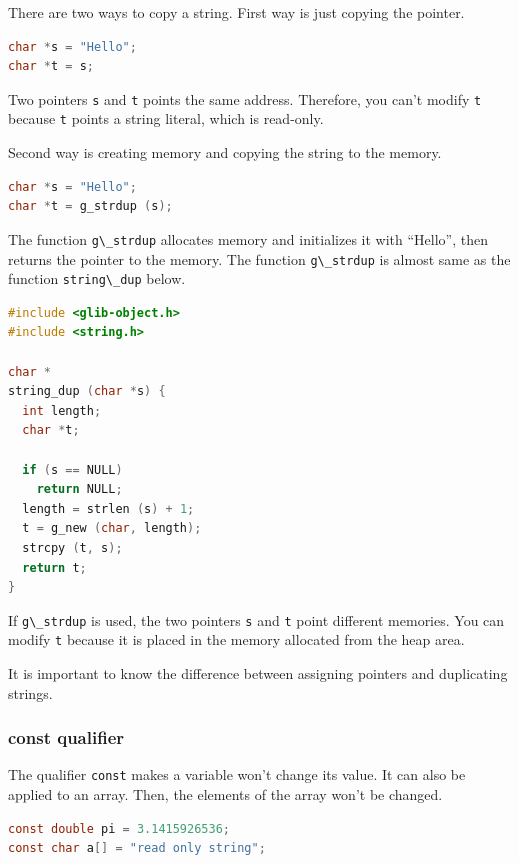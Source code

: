 There are two ways to copy a string. First way is just copying the
pointer.

\begin{lstlisting}[language=C]
char *s = "Hello";
char *t = s;
\end{lstlisting}

Two pointers \passthrough{\lstinline!s!} and \passthrough{\lstinline!t!}
points the same address. Therefore, you can't modify
\passthrough{\lstinline!t!} because \passthrough{\lstinline!t!} points a
string literal, which is read-only.

Second way is creating memory and copying the string to the memory.

\begin{lstlisting}[language=C]
char *s = "Hello";
char *t = g_strdup (s);
\end{lstlisting}

The function \passthrough{\lstinline!g\_strdup!} allocates memory and
initializes it with ``Hello'', then returns the pointer to the memory.
The function \passthrough{\lstinline!g\_strdup!} is almost same as the
function \passthrough{\lstinline!string\_dup!} below.

\begin{lstlisting}[language=C]
#include <glib-object.h>
#include <string.h>

char *
string_dup (char *s) {
  int length;
  char *t;

  if (s == NULL)
    return NULL;
  length = strlen (s) + 1;
  t = g_new (char, length);
  strcpy (t, s);
  return t;
}
\end{lstlisting}

If \passthrough{\lstinline!g\_strdup!} is used, the two pointers
\passthrough{\lstinline!s!} and \passthrough{\lstinline!t!} point
different memories. You can modify \passthrough{\lstinline!t!} because
it is placed in the memory allocated from the heap area.

It is important to know the difference between assigning pointers and
duplicating strings.

\subsubsection{const qualifier}\label{const-qualifier}

The qualifier \passthrough{\lstinline!const!} makes a variable won't
change its value. It can also be applied to an array. Then, the elements
of the array won't be changed.

\begin{lstlisting}[language=C]
const double pi = 3.1415926536;
const char a[] = "read only string";
\end{lstlisting}

